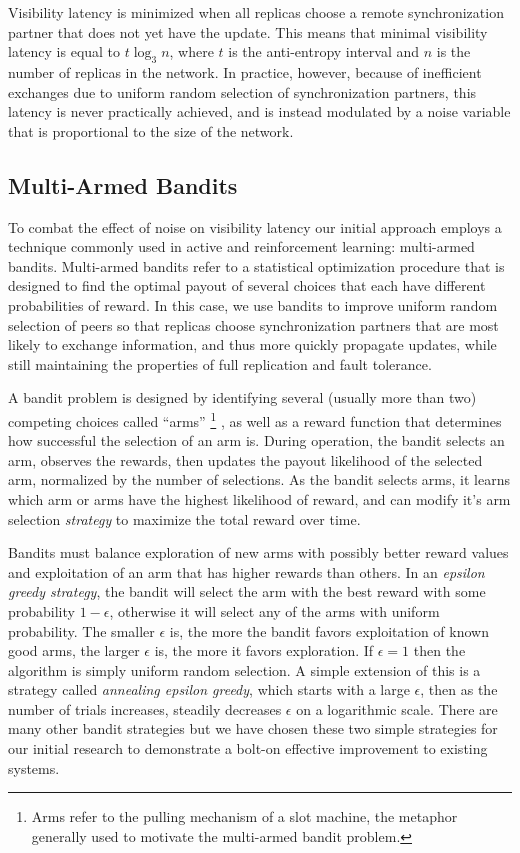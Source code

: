 Visibility latency is minimized when all replicas choose a remote
synchronization partner that does not yet have the update.
This means that minimal visibility latency is equal to $t\log_3n$, where
$t$ is the anti-entropy interval and $n$ is the number of replicas in the
network.
In practice, however, because of inefficient exchanges due to uniform random
selection of synchronization partners, this latency is never practically
achieved, and is instead modulated by a noise variable that is
proportional to the size of the network.

\subsection{Multi-Armed Bandits}
\label{ch06_multi_armed_bandits}

To combat the effect of noise on visibility latency our initial approach
employs a technique commonly used in active and reinforcement learning:
multi-armed bandits.
Multi-armed bandits refer to a statistical optimization procedure that is
designed to find the optimal payout of several choices that each have
different probabilities of reward.
In this case, we use bandits to improve uniform random selection of peers so
that replicas choose synchronization partners that are most likely to exchange
information, and thus more quickly propagate updates, while still maintaining
the properties of full replication and fault tolerance.

A bandit problem is designed by identifying several (usually more than two)
competing choices called ``arms''\renewcommand{\baselinestretch}{1} \small\footnotesize\footnote{Arms refer to the pulling
mechanism of a slot machine, the metaphor generally used to motivate the
multi-armed bandit problem.}\renewcommand{\baselinestretch}{2} \small\normalsize, as well as a reward function that determines how
successful the selection of an arm is.
During operation, the bandit selects an arm, observes the rewards, then
updates the payout likelihood of the selected arm, normalized by the number
of selections.
As the bandit selects arms, it learns which arm or arms have the highest
likelihood of reward, and can modify it's arm selection \emph{strategy} to
maximize the total reward over time.

Bandits must balance exploration of new arms with possibly better reward
values and exploitation of an arm that has higher rewards than others.
In an \emph{epsilon greedy strategy}, the bandit will select the arm with
the best reward with some probability $1-\epsilon$, otherwise it will select
any of the arms with uniform probability.
The smaller $\epsilon$ is, the more the bandit favors exploitation of known
good arms, the larger $\epsilon$ is, the more it favors exploration.
If $\epsilon=1$ then the algorithm is simply uniform random selection.
A simple extension of this is a strategy called \emph{annealing epsilon
greedy}, which starts with a large $\epsilon$, then as the number of trials
increases, steadily decreases $\epsilon$ on a logarithmic scale.
There are many other bandit strategies but we have chosen these two simple
strategies for our initial research to demonstrate a bolt-on effective
improvement to existing systems.

